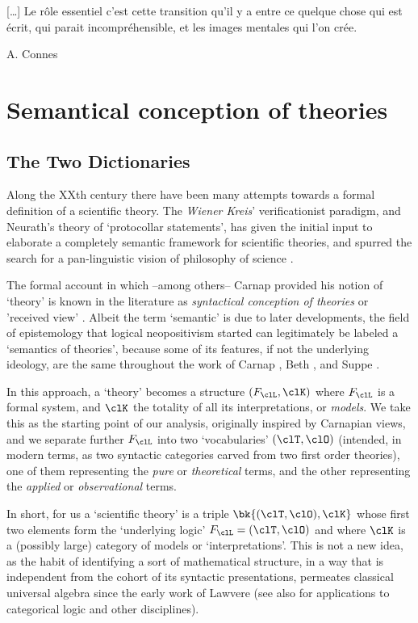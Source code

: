 \epigraph{[\dots\unkern] Le rôle essentiel c'est cette transition qu'il y a entre ce quelque chose qui est écrit, qui parait incompréhensible, et les images mentales qui l'on crée.}{A. Connes}
\section{Semantical conception of theories}
\subsection{The Two Dictionaries}
Along the XXth century there have been many attempts towards a formal definition of a scientific theory. The \emph{Wiener Kreis}' verificationist paradigm, and Neurath's theory of `protocollar statements', has given the initial input to elaborate a completely semantic framework for scientific theories, and spurred the search for a pan-linguistic vision of philosophy of science \cite{Weinb}.

The formal account in which --among others-- Carnap \cite{carnapfound} provided his notion of `theory' is known in the literature as \emph{syntactical conception of theories} or 'received view' \cite{krause-foundation,krause2011axiomatization,giunti2016}. Albeit the term `semantic' is due to later developments, the field of epistemology that logical neopositivism started can legitimately be labeled a `semantics of theories', because some of its features, if not the underlying ideology, are the same throughout the work of Carnap \cite{carnap56,carnapfound},  Beth \cite{?}, and Suppe \cite{suppe89}.

In this approach, a `theory' becomes a structure $(F_\clL, \clK)$ where $F_\clL$ is a formal system, and $\clK$ the totality of all its interpretations, or \emph{models}. We take this as the starting point of our analysis, originally inspired by Carnapian views, and we separate further $F_\clL$ into two `vocabularies' $(\clT,\clO)$ (intended, in modern terms, as two syntactic categories carved from two first order theories), one of them representing the \emph{pure} or \emph{theoretical} terms, and the other representing the \emph{applied} or \emph{observational} terms.

In short, for us a `scientific theory' is a triple $\bk{(\clT,\clO), \clK}$ whose first two elements form the `underlying logic' $F_\clL=(\clT,\clO)$ and where $\clK$ is a (possibly large) category of models or `interpretations'. This is not a new idea, as the habit of identifying a sort of mathematical structure, in a way that is independent from the cohort of its syntactic presentations, permeates classical universal algebra since the early work of Lawvere \cite{lawvere1963functorial,lawvere1996unity} (see also \cite{abramskyno,Borceux1994,makkai1989accessible} for applications to categorical logic and other disciplines).

